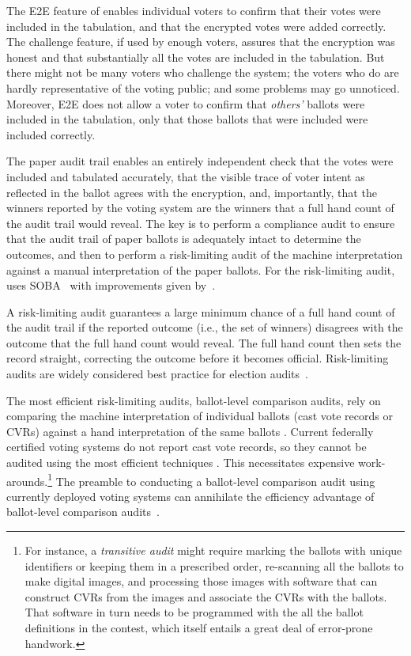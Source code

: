 \label{sec:audit}

The E2E feature of \projname enables individual voters to confirm that their votes were included in the
tabulation, and that the encrypted votes were added correctly.
The challenge feature, if used by enough voters, assures that the encryption was honest
and that substantially all the votes are included in the tabulation.
But there might not be many voters who challenge the system; the voters who do are hardly
representative of the voting public; and some problems may go unnoticed.
Moreover, E2E does not allow a voter to confirm that \emph{others'} ballots were
included in the tabulation, only that those ballots that were included were included correctly.

The paper audit trail enables an entirely independent check 
that the votes were included and tabulated accurately, that
the visible trace of voter intent as reflected in the ballot agrees with the encryption, and, importantly, that
the winners reported by the voting system are the winners that a full hand count of the audit trail would
reveal.
The key is to perform a compliance audit to ensure that the audit trail of paper ballots
is adequately intact to determine the outcomes, and then to perform a risk-limiting
audit of the machine interpretation against a manual interpretation of the paper ballots.
For the risk-limiting audit, \projname uses SOBA~\cite{benalohEtal11} with improvements
given by~\cite{lindemanStark12}.

A risk-limiting audit guarantees a large minimum chance of a full hand count of the audit trail if the
reported outcome (i.e., the set of winners) 
disagrees with the outcome that the full hand count would reveal.
The full hand count then sets the record straight, correcting the outcome before it becomes official.
Risk-limiting audits are widely considered best practice for election audits~\cite{bestPractices08,whitePaper12}.

The most efficient risk-limiting audits, ballot-level comparison audits, rely on comparing 
the machine interpretation of individual ballots
(cast vote records or CVRs) 
against a hand interpretation of the same ballots \cite{stark10d,benalohEtal11,lindemanStark12}.
Current federally certified voting systems do not report cast vote records, so they cannot
be audited using the most efficient techniques \cite{lindemanStark12,starkWagner12}.
This necessitates expensive work-arounds.\footnote{%
    For instance, a {\em transitive audit\/} might require marking the ballots with unique identifiers
    or keeping them in a prescribed order, re-scanning all the ballots to make digital images,
    and processing those images with software that can construct CVRs from the images and
   associate the CVRs with the ballots.
   That software in turn needs to be programmed with the all the ballot definitions in the contest,
    which itself entails a great deal of error-prone handwork.
}
The preamble to conducting a ballot-level comparison audit using currently deployed voting systems
can annihilate the efficiency advantage of ballot-level comparison
audits~\cite{starkWagner12}.

